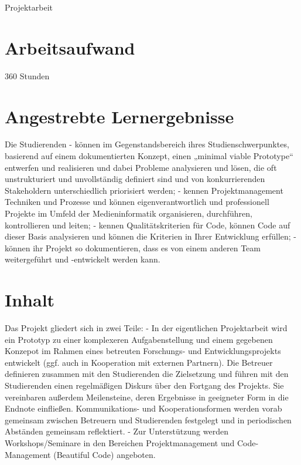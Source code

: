 Projektarbeit

\section*{Arbeitsaufwand\label{/mi-2017/modulbeschreibungen-master/MA_Modul_Projekt_Entwicklung}}\label{arbeitsaufwandpathlabelmi-2017modulbeschreibungen-mastermaux5fmodulux5fprojektux5fentwicklung}

360 Stunden

\section*{Angestrebte
Lernergebnisse\label{/mi-2017/modulbeschreibungen-master/MA_Modul_Projekt_Entwicklung}}\label{angestrebte-lernergebnissepathlabelmi-2017modulbeschreibungen-mastermaux5fmodulux5fprojektux5fentwicklung}

Die Studierenden - können im Gegenstandsbereich ihres
Studienschwerpunktes, basierend auf einem dokumentierten Konzept, einen
„minimal viable Prototype`` entwerfen und realisieren und dabei Probleme
analysieren und lösen, die oft unstrukturiert und unvollständig
definiert sind und von konkurrierenden Stakeholdern unterschiedlich
priorisiert werden; - kennen Projektmanagement Techniken und Prozesse
und können eigenverantwortlich und professionell Projekte im Umfeld der
Medieninformatik organisieren, durchführen, kontrollieren und leiten; -
kennen Qualitätskriterien für Code, können Code auf dieser Basis
analysieren und können die Kriterien in Ihrer Entwicklung erfüllen; -
können ihr Projekt so dokumentieren, dass es von einem anderen Team
weitergeführt und -entwickelt werden kann.

\section*{Inhalt\label{/mi-2017/modulbeschreibungen-master/MA_Modul_Projekt_Entwicklung}}\label{inhaltpathlabelmi-2017modulbeschreibungen-mastermaux5fmodulux5fprojektux5fentwicklung}

Das Projekt gliedert sich in zwei Teile: - In der eigentlichen
Projektarbeit wird ein Prototyp zu einer komplexeren Aufgabenstellung
und einem gegebenen Konzepot im Rahmen eines betreuten Forschungs- und
Entwicklungsprojekts entwickelt (ggf. auch in Kooperation mit externen
Partnern). Die Betreuer definieren zusammen mit den Studierenden die
Zielsetzung und führen mit den Studierenden einen regelmäßigen Diskurs
über den Fortgang des Projekts. Sie vereinbaren außerdem Meilensteine,
deren Ergebnisse in geeigneter Form in die Endnote einfließen.
Kommunikations- und Kooperationsformen werden vorab gemeinsam zwischen
Betreuern und Studierenden festgelegt und in periodischen Abständen
gemeinsam reflektiert. - Zur Unterstützung werden Workshops/Seminare in
den Bereichen Projektmanagement und Code-Management (Beautiful Code)
angeboten.

